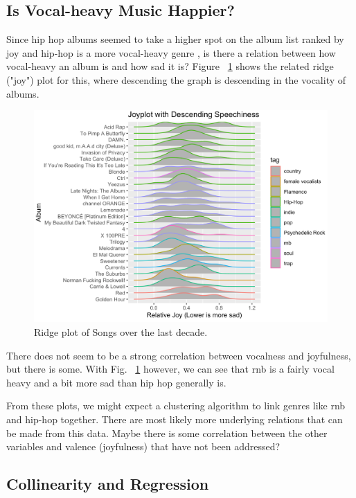 \documentclass[conference]{IEEEtran}
\begin{document}
\subsection{Is Vocal-heavy Music Happier?}

Since hip hop albums seemed to take a higher spot on the album list ranked by joy and hip-hop is a more vocal-heavy genre \cite{b8}, is there a relation between how vocal-heavy an album is and how sad it is?
Figure ~\ref{fig:sad-words} shows the related ridge ("joy") plot for this, where descending the graph is descending in the vocality of albums. 

\begin{figure}[htbp]
\centerline{\includegraphics[width=\columnwidth]{spotify-images/sad-words.png}}
\caption{Ridge plot of Songs over the last decade.}
\label{fig:sad-words}
\end{figure}

There does not seem to be a strong correlation between vocalness and joyfulness, but there is some. With Fig. ~\ref{fig:sad-words} however, we can see that rnb is a fairly vocal heavy and a bit more sad than hip hop generally is. 

From these plots, we might expect a clustering algorithm to link genres like rnb and hip-hop together. There are most likely more underlying relations that can be made from this data. Maybe there is some correlation between the other variables and valence (joyfulness) that have not been addressed? 

\subsection{Collinearity and Regression}
\end{document}
